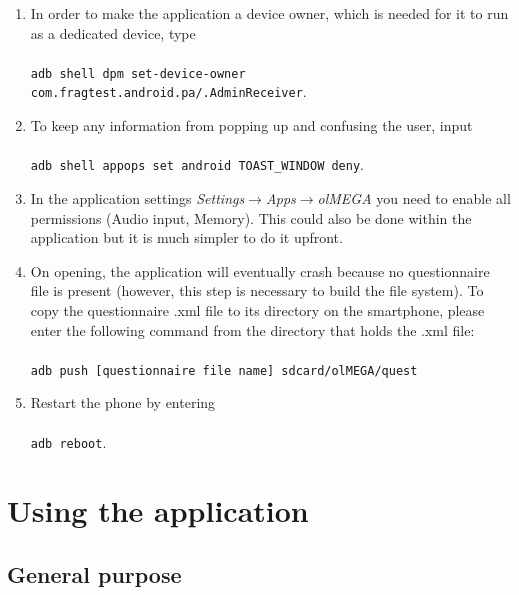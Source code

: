 \documentclass[11pt,a4paper,titlepage]{article}
\begin{document}
\begin{enumerate}
	\item In order to make the application a device owner, which is needed for it to run as a dedicated device, type\\
	\\
	\colorbox{black!10}{\texttt{adb shell dpm set-device-owner com.fragtest.android.pa/.AdminReceiver}}.\\
	
	\item To keep any information from popping up and confusing the user, input\\
	\\
	\colorbox{black!10}{\texttt{adb shell appops set android TOAST\_WINDOW deny}}.\\
	
	\item In the application settings \textit{Settings}$\rightarrow$\textit{Apps}$\rightarrow$\textit{olMEGA} you need to enable all permissions (Audio input, Memory). This could also be done within the application but it is much simpler to do it upfront.\\
	
	\item On opening, the application will eventually crash because no questionnaire file is present (however, this step is necessary to build the file system). To copy the questionnaire .xml file to its directory on the smartphone, please enter the following command from the directory that holds the .xml file:\\
	\\
	\colorbox{black!10}{\texttt{adb push [questionnaire file name] sdcard/olMEGA/quest}}\\
	
	
	\newpage
	
	
	\item Restart the phone by entering\\ 
	\\
	\colorbox{black!10}{\texttt{adb reboot}}.\\
\end{enumerate}


\section{Using the application}\label{sec_usage}


\subsection{General purpose}
\end{document}
